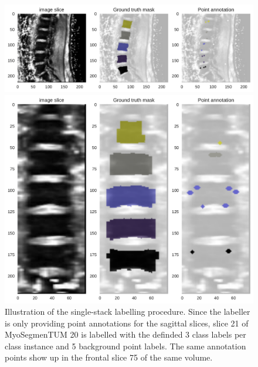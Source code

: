 \begin{figure}
    \centering
    \centering
    \begin{minipage}{.75\textwidth}
        \includegraphics[width=.99\textwidth]{images/MyoSegmenTUM020_s21_points.pdf}
    \end{minipage} 
    \vspace{1 mm}
    \begin{minipage}{.75\textwidth}
        \includegraphics[width=.99\textwidth]{images/MyoSegmenTUM020_s75_front_points.pdf}
    \end{minipage} 
    \vspace{2 mm}
    \caption{Illustration of the single-stack labelling procedure.
    Since the labeller is only providing point annotations for the sagittal slices, slice 21 of MyoSegmenTUM 20 is labelled with the definded 3 class labels per class instance and 5 background point labels.
    The same annotation points show up in the frontal slice 75 of the same volume. 
    \protect\label{fig:inferepoints_1}}
\end{figure}

